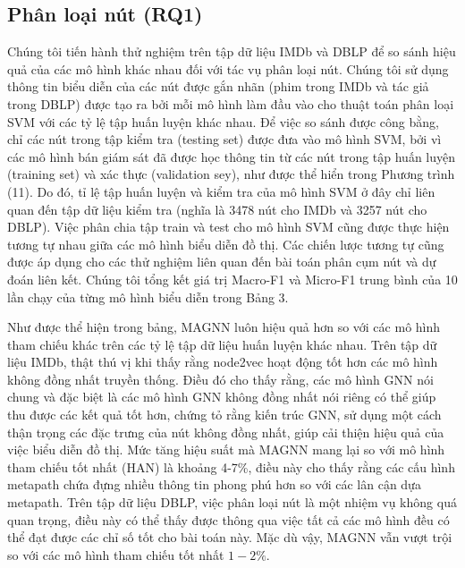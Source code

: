 \subsection{Phân loại nút (RQ1)}
Chúng tôi tiến hành thử nghiệm trên tập dữ liệu IMDb và DBLP để so sánh hiệu quả của các mô hình khác nhau đối với tác vụ phân loại nút. Chúng tôi sử dụng thông tin biểu diễn của các nút được gắn nhãn (phim trong IMDb và tác giả trong DBLP) được tạo ra bởi mỗi mô hình làm đầu vào cho thuật toán phân loại SVM với các tỷ lệ tập huấn luyện khác nhau. Để việc so sánh được công bằng, chỉ các nút trong tập kiểm tra (testing set) được đưa vào mô hình SVM, bởi vì các mô hình bán giám sát đã được học thông tin từ các nút trong tập huấn luyện (training set) và xác thực (validation sey), như được thể hiển trong Phương trình (11). Do đó, tỉ lệ tập huấn luyện và kiểm tra của mô hình SVM ở đây chỉ liên quan đến tập dữ liệu kiểm tra (nghĩa là 3478 nút cho IMDb và 3257 nút cho DBLP). Việc phân chia tập train và test cho mô hình SVM cũng được thực hiện tương tự nhau giữa các mô hình biểu diễn đồ thị. Các chiến lược tương tự cũng được áp dụng cho các thử nghiệm liên quan đến bài toán phân cụm nút và dự đoán liên kết. Chúng tôi tổng kết giá trị Macro-F1 và Micro-F1 trung bình của 10 lần chạy của từng mô hình biểu diễn trong Bảng 3.

Như được thể hiện trong bảng, MAGNN luôn hiệu quả hơn so với các mô hình tham chiếu khác trên các tỷ lệ tập dữ liệu huấn luyện khác nhau. Trên tập dữ liệu IMDb, thật thú vị khi thấy rằng node2vec hoạt động tốt hơn các mô hình không đồng nhất truyền thống. Điều đó cho thấy rằng, các mô hình GNN nói chung và đặc biệt là các mô hình GNN không đồng nhất nói riêng có thể giúp thu được các kết quả tốt hơn, chứng tỏ rằng kiến trúc GNN, sử dụng một cách thận trọng các đặc trưng của nút không đồng nhất, giúp cải thiện hiệu quả của việc biểu diễn đồ thị. Mức tăng hiệu suất mà MAGNN mang lại so với mô hình tham chiếu tốt nhất (HAN) là khoảng 4-7\%, điều này cho thấy rằng các cấu hình metapath chứa đựng nhiều thông tin phong phú hơn so với các lân cận dựa metapath. Trên tập dữ liệu DBLP, việc phân loại nút là một nhiệm vụ không quá quan trọng, điều này có thể thấy được thông qua việc tất cả các mô hình đều có thể đạt được các chỉ số tốt cho bài toán này. Mặc dù vậy, MAGNN vẫn vượt trội so với các mô hình tham chiếu tốt nhất $1-2 \%$.


